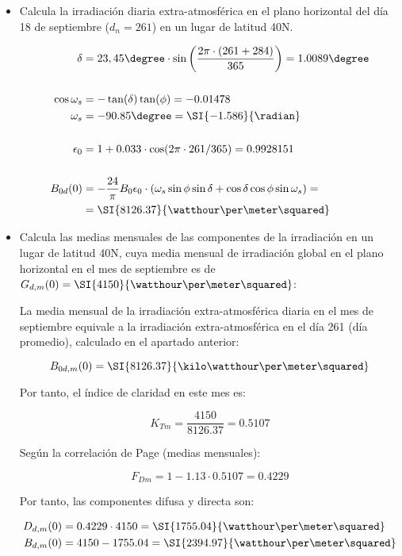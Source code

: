 \begin{itemize}
\item Calcula la irradiación diaria extra-atmosférica en el plano
  horizontal del día 18 de septiembre ($d_n = 261$) en un lugar de
  latitud 40\degree N.

\begin{align*}
  \delta &= 23,45\degree\cdot\sin\left(\frac{2\pi\cdot\left(261+284\right)}{365}\right) = 1.0089\degree\\
  \\
  \cos \omega_s &= -\tan(\delta) \tan(\phi) = -0.01478\\
  \omega_s &= -90.85\degree = \SI{-1.586}{\radian}\\
  \\
  \epsilon_0 &= 1+0.033\cdot\cos(2\pi\cdot261/365) = 0.9928151\\
  \\
  B_{0d}(0) &= -\frac{24}{\pi}B_{0}\epsilon_{0}\cdot\left(\omega_{s}\sin\phi\sin\delta+\cos\delta\cos\phi\sin\omega_{s}\right) = \\
         &= \SI{8126.37}{\watthour\per\meter\squared}
\end{align*}

\item Calcula las medias mensuales de las componentes de la
  irradiación en un lugar de latitud 40\degree N, cuya media mensual
  de irradiación global en el plano horizontal en el mes de septiembre
  es de $G_{d,m}(0) = \SI{4150}{\watthour\per\meter\squared}$:

  La media mensual de la irradiación extra-atmosférica diaria en el
  mes de septiembre equivale a la irradiación extra-atmosférica en el
  día 261 (día promedio), calculado en el apartado anterior:

\[
  B_{0d,m}(0) = \SI{8126.37}{\kilo\watthour\per\meter\squared}
\]

Por tanto, el índice de claridad en este mes es:

\[
  K_{Tm}=\frac{4150}{8126.37}=0.5107
\]

Según la correlación de Page (medias mensuales):

\[
  F_{Dm} = 1 - 1.13 \cdot 0.5107 = 0.4229
\]

Por tanto, las componentes difusa y directa son:

\begin{align*}
  D_{d,m}(0) &= 0.4229 \cdot 4150 = \SI{1755.04}{\watthour\per\meter\squared}\\
  B_{d,m}(0) &= 4150 - 1755.04 = \SI{2394.97}{\watthour\per\meter\squared}  
\end{align*}



\end{itemize}
